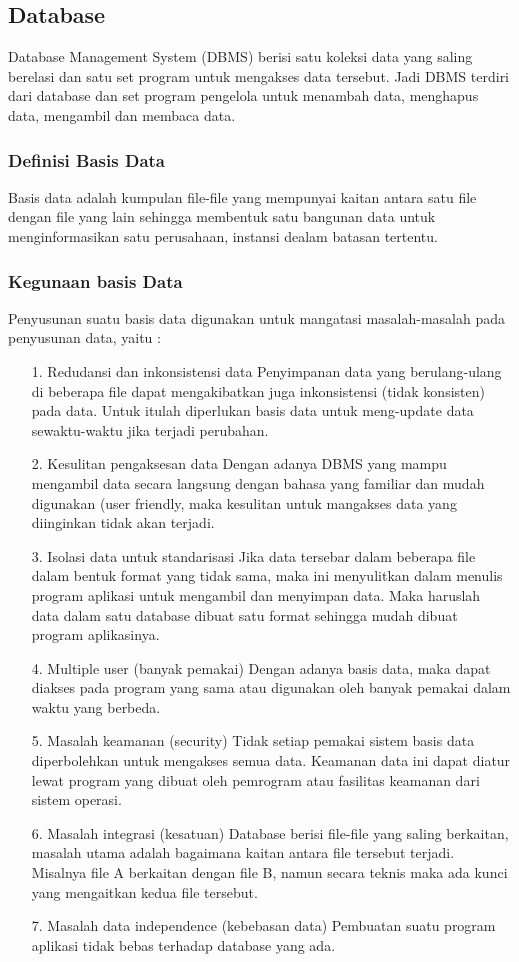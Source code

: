 \documentclass{jtetiproposalskripsi}
\begin{document}
\subsection{Database}
Database Management System (DBMS) berisi satu koleksi data yang saling berelasi dan satu set program untuk mengakses data tersebut. Jadi DBMS terdiri dari database dan set program pengelola untuk menambah data, menghapus data, mengambil dan membaca data.

\subsubsection{Definisi Basis Data}
Basis data adalah kumpulan file-file yang mempunyai kaitan antara satu file dengan file yang lain sehingga membentuk satu bangunan data untuk menginformasikan satu perusahaan, instansi dealam batasan tertentu.

\subsubsection{Kegunaan basis Data}
Penyusunan suatu basis data digunakan untuk mangatasi masalah-masalah pada penyusunan data, yaitu :
\begin{itemize}

\item[1.]	Redudansi dan inkonsistensi data
Penyimpanan data yang berulang-ulang di beberapa file dapat mengakibatkan juga inkonsistensi (tidak konsisten) pada data. Untuk itulah diperlukan basis data untuk meng-update data sewaktu-waktu jika terjadi perubahan.
\item[2.]	Kesulitan pengaksesan data
Dengan adanya DBMS yang mampu mengambil data secara langsung dengan bahasa yang familiar dan mudah digunakan (user friendly, maka kesulitan untuk mangakses data yang diinginkan tidak akan terjadi.
\item[3.]	Isolasi data untuk standarisasi
Jika data tersebar dalam beberapa file dalam bentuk format yang tidak sama, maka ini menyulitkan dalam menulis program aplikasi untuk mengambil dan menyimpan data. Maka haruslah data dalam satu database dibuat satu format sehingga mudah dibuat program aplikasinya.
\item[4.]	Multiple user (banyak pemakai)
Dengan adanya basis data, maka dapat diakses pada program yang sama atau digunakan oleh banyak pemakai dalam waktu yang berbeda.
\item[5.]	Masalah keamanan (security)
Tidak setiap pemakai sistem basis data diperbolehkan untuk mengakses semua data. Keamanan data ini dapat diatur lewat program yang dibuat oleh pemrogram atau fasilitas keamanan dari sistem operasi.
\item[6.]	Masalah integrasi (kesatuan)
Database berisi file-file yang saling berkaitan, masalah utama adalah bagaimana kaitan antara file tersebut terjadi. Misalnya file A berkaitan dengan file B, namun secara teknis maka ada kunci yang mengaitkan kedua file tersebut.
\item[7.]	Masalah data independence (kebebasan data)
Pembuatan suatu program aplikasi tidak bebas terhadap database yang ada.
\end{itemize}
\end{document}
